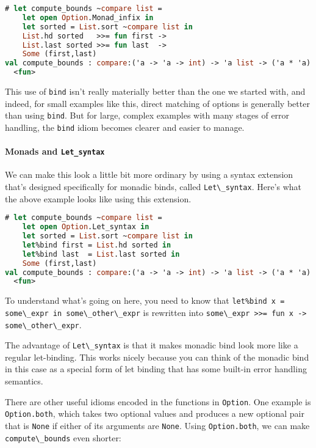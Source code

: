 \begin{lstlisting}[language=Caml]
# let compute_bounds ~compare list =
    let open Option.Monad_infix in
    let sorted = List.sort ~compare list in
    List.hd sorted   >>= fun first ->
    List.last sorted >>= fun last  ->
    Some (first,last)
val compute_bounds : compare:('a -> 'a -> int) -> 'a list -> ('a * 'a) option =
  <fun>
\end{lstlisting}

This use of \passthrough{\lstinline!bind!} isn't really materially
better than the one we started with, and indeed, for small examples like
this, direct matching of options is generally better than using
\passthrough{\lstinline!bind!}. But for large, complex examples with
many stages of error handling, the \passthrough{\lstinline!bind!} idiom
becomes clearer and easier to manage.

\hypertarget{monads-and-let_syntax}{%
\paragraph{\texorpdfstring{Monads and
\texttt{Let\_syntax}}{Monads and Let\_syntax}}\label{monads-and-let_syntax}}

We can make this look a little bit more ordinary by using a syntax
extension that's designed specifically for monadic binds, called
\passthrough{\lstinline!Let\_syntax!}. Here's what the above example
looks like using this extension.

\begin{lstlisting}[language=Caml]
# let compute_bounds ~compare list =
    let open Option.Let_syntax in
    let sorted = List.sort ~compare list in
    let%bind first = List.hd sorted in
    let%bind last  = List.last sorted in
    Some (first,last)
val compute_bounds : compare:('a -> 'a -> int) -> 'a list -> ('a * 'a) option =
  <fun>
\end{lstlisting}

To understand what's going on here, you need to know that
\passthrough{\lstinline!let\%bind x = some\_expr in some\_other\_expr!}
is rewritten into
\passthrough{\lstinline!some\_expr >>= fun x -> some\_other\_expr!}.

The advantage of \passthrough{\lstinline!Let\_syntax!} is that it makes
monadic bind look more like a regular let-binding. This works nicely
because you can think of the monadic bind in this case as a special form
of let binding that has some built-in error handling semantics.

There are other useful idioms encoded in the functions in
\passthrough{\lstinline!Option!}. One example is
\passthrough{\lstinline!Option.both!}, which takes two optional values
and produces a new optional pair that is \passthrough{\lstinline!None!}
if either of its arguments are \passthrough{\lstinline!None!}. Using
\passthrough{\lstinline!Option.both!}, we can make
\passthrough{\lstinline!compute\_bounds!} even shorter:

